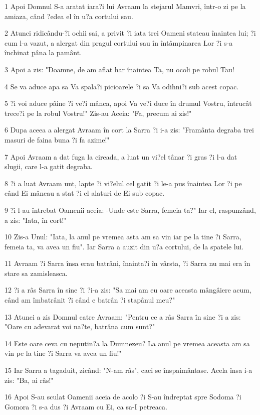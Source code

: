 \par 1 Apoi Domnul S-a aratat iara?i lui Avraam la stejarul Mamvri, într-o zi pe la amiaza, când ?edea el în u?a cortului sau.
\par 2 Atunci ridicându-?i ochii sai, a privit ?i iata trei Oameni stateau înaintea lui; ?i cum l-a vazut, a alergat din pragul cortului sau în întâmpinarea Lor ?i s-a închinat pâna la pamânt.
\par 3 Apoi a zis: "Doamne, de am aflat har înaintea Ta, nu ocoli pe robul Tau!
\par 4 Se va aduce apa sa Va spala?i picioarele ?i sa Va odihni?i sub acest copac.
\par 5 ?i voi aduce pâine ?i ve?i mânca, apoi Va ve?i duce în drumul Vostru, întrucât trece?i pe la robul Vostru!" Zis-au Aceia: "Fa, precum ai zis!"
\par 6 Dupa aceea a alergat Avraam în cort la Sarra ?i i-a zis: "Framânta degraba trei masuri de faina buna ?i fa azime!"
\par 7 Apoi Avraam a dat fuga la cireada, a luat un vi?el tânar ?i gras ?i l-a dat slugii, care l-a gatit degraba.
\par 8 ?i a luat Avraam unt, lapte ?i vi?elul cel gatit ?i le-a pus înaintea Lor ?i pe când Ei mâncau a stat ?i el alaturi de Ei sub copac.
\par 9 ?i l-au întrebat Oamenii aceia: -Unde este Sarra, femeia ta?" Iar el, raspunzând, a zis: "Iata, în cort!"
\par 10 Zis-a Unul: "Iata, la anul pe vremea asta am sa vin iar pe la tine ?i Sarra, femeia ta, va avea un fiu". Iar Sarra a auzit din u?a cortului, de la spatele lui.
\par 11 Avraam ?i Sarra însa erau batrâni, înainta?i în vârsta, ?i Sarra nu mai era în stare sa zamisleasca.
\par 12 ?i a râs Sarra în sine ?i ?i-a zis: "Sa mai am eu oare aceasta mângâiere acum, când am îmbatrânit ?i când e batrân ?i stapânul meu?"
\par 13 Atunci a zis Domnul catre Avraam: "Pentru ce a râs Sarra în sine ?i a zis: "Oare cu adevarat voi na?te, batrâna cum sunt?"
\par 14 Este oare ceva cu neputin?a la Dumnezeu? La anul pe vremea aceasta am sa vin pe la tine ?i Sarra va avea un fiu!"
\par 15 Iar Sarra a tagaduit, zicând: "N-am râs", caci se înspaimântase. Acela însa i-a zis: "Ba, ai râs!"
\par 16 Apoi S-au sculat Oamenii aceia de acolo ?i S-au îndreptat spre Sodoma ?i Gomora ?i s-a dus ?i Avraam cu Ei, ca sa-I petreaca.
